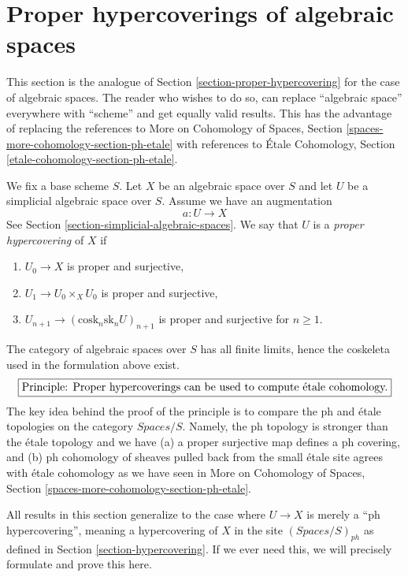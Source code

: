 \section{Proper hypercoverings of algebraic spaces}
\label{section-proper-hypercovering-spaces}

\noindent
This section is the analogue of Section \ref{section-proper-hypercovering}
for the case of algebraic spaces.
The reader who wishes to do so, can replace ``algebraic space''
everywhere with ``scheme'' and get equally valid results.
This has the advantage of replacing the references to
More on Cohomology of Spaces, Section
\ref{spaces-more-cohomology-section-ph-etale}
with references to
\'Etale Cohomology, Section \ref{etale-cohomology-section-ph-etale}.

\medskip\noindent
We fix a base scheme $S$.
Let $X$ be an algebraic space over $S$ and let $U$ be a simplicial
algebraic space over $S$. Assume we have an augmentation
$$
a : U \to X
$$
See Section \ref{section-simplicial-algebraic-spaces}.
We say that $U$ is a {\it proper hypercovering} of $X$ if
\begin{enumerate}
\item $U_0 \to X$ is proper and surjective,
\item $U_1 \to U_0 \times_X U_0$ is proper and surjective,
\item $U_{n + 1} \to (\text{cosk}_n\text{sk}_n U)_{n + 1}$
is proper and surjective for $n \geq 1$.
\end{enumerate}
The category of algebraic spaces over $S$ has all finite limits, hence the
coskeleta used in the formulation above exist.
$$
\fbox{Principle: Proper hypercoverings can be
used to compute \'etale cohomology.}
$$
The key idea behind the proof of the principle is to compare the
ph and \'etale topologies on the category $\textit{Spaces}/S$.
Namely, the ph topology is stronger than the \'etale topology and we have
(a) a proper surjective map defines a ph covering, and
(b) ph cohomology of sheaves pulled back from the small \'etale site
agrees with \'etale cohomology as we have seen in
More on Cohomology of Spaces, Section
\ref{spaces-more-cohomology-section-ph-etale}.

\medskip\noindent
All results in this section generalize to the case
where $U \to X$ is merely a ``ph hypercovering'', meaning a
hypercovering of $X$ in the site $(\textit{Spaces}/S)_{ph}$
as defined in Section \ref{section-hypercovering}. If we ever need
this, we will precisely formulate and prove this here.

